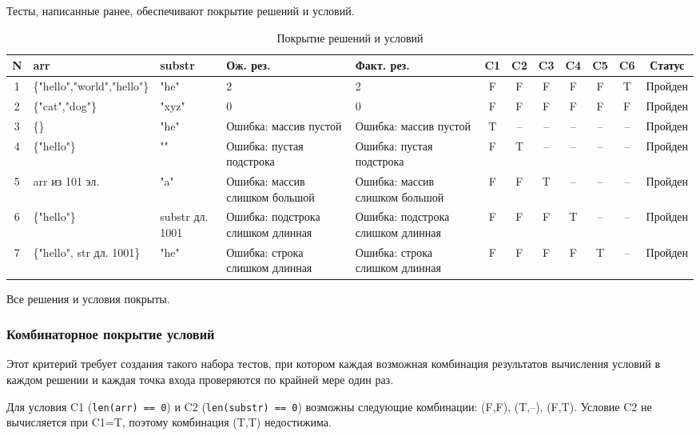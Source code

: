 \documentclass{article}[14pt]
\begin{document}
Тесты, написанные ранее, обеспечивают покрытие решений и условий.

\begin{table}[h!]
\centering
\caption{Покрытие решений и условий}
\begin{tabularx}{\textwidth}{|c|X|X|X|X|c|c|c|c|c|c|c|}
\hline
\textbf{N} & \textbf{arr} & \textbf{substr} & \textbf{Ож. рез.} & \textbf{Факт. рез.} & \textbf{C1} & \textbf{C2} & \textbf{C3} & \textbf{C4} & \textbf{C5} & \textbf{C6} & \textbf{Статус} \\
\hline
1 & \{"hello","world","hello"\} & "he" & 2 & 2 & F & F & F & F & F & T & Пройден \\
\hline
2 & \{"cat","dog"\} & "xyz" & 0 & 0 & F & F & F & F & F & F & Пройден \\
\hline
3 & \{\} & "he" & Ошибка: массив пустой & Ошибка: массив пустой & T & -- & -- & -- & -- & -- & Пройден \\
\hline
4 & \{"hello"\} & "" & Ошибка: пустая подстрока & Ошибка: пустая подстрока & F & T & -- & -- & -- & -- & Пройден \\
\hline
5 & arr из 101 эл. & "a" & Ошибка: массив слишком большой & Ошибка: массив слишком большой & F & F & T & -- & -- & -- & Пройден \\
\hline
6 & \{"hello"\} & substr дл. 1001 & Ошибка: подстрока слишком длинная & Ошибка: подстрока слишком длинная & F & F & F & T & -- & -- & Пройден \\
\hline
7 & \{"hello", str дл. 1001\} & "he" & Ошибка: строка слишком длинная & Ошибка: строка слишком длинная & F & F & F & F & T & -- & Пройден \\
\hline
\end{tabularx}
\end{table}

Все решения и условия покрыты.

\subsubsection{Комбинаторное покрытие условий}

Этот критерий требует создания такого набора тестов, при котором каждая возможная комбинация результатов вычисления условий в каждом решении и каждая
точка входа проверяются по крайней мере один раз.

Для условия C1 (\texttt{len(arr) == 0}) и C2 (\texttt{len(substr) == 0}) возможны следующие комбинации: (F,F), (T,--), (F,T). Условие C2 не вычисляется при C1=T, поэтому комбинация (T,T) недостижима.
\end{document}

